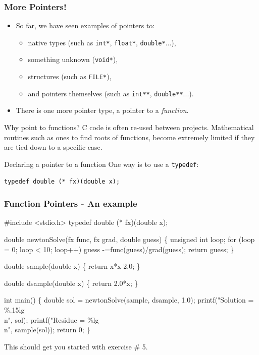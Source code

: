 \documentclass[table]{beamer}
\newif\ifschigh\schighfalse
\newcommand{\kw}[1]{\ifschigh\textcolor{red}{#1}\else\textcolor{keyword}{#1}\fi}
\newcommand{\kt}[1]{\ifschigh\textcolor{red}{#1}\else\textcolor{ctext}{#1}\fi}
\begin{document}
{
\begin{frame}[fragile]
\frametitle{More Pointers!}
\begin{itemize}
\item So far, we have seen examples of pointers to:
\begin{itemize}
\item native types (such as {\tt\kw{int}*}, {\tt\kw{float}*}, {\tt\kw{double}*}...),
\item something unknown ({\tt\kw{void}*}),
\item structures (such as {\tt FILE*}),
\item and pointers themselves (such as {\tt\kw{int}**}, {\tt\kw{double}**}...).
\end{itemize}
\item There is one more pointer type, a pointer to a \emph{function}.
\end{itemize}

\begin{block}{Why point to functions?}
C code is often re-used between projects. Mathematical routines such as ones to find roots of functions, become extremely limited if they are tied down to a specific case.
\end{block}

\begin{exampleblock}{Declaring a pointer to a function}
One way is to use a {\tt\kw{typedef}}:
\vspace{-0.1in}
\begin{center}
\tt \kw{typedef} \kw{double} (* fx)(\kw{double} x);
\end{center}
\end{exampleblock}
\end{frame}
}

\begin{frame}[fragile]
\frametitle{Function Pointers - An example}
\vspace{-0.2in}
\begin{semiverbatim}
\tiny
\kw{\#include} \kt{<stdio.h>}
\kw{typedef double} (* fx)(\kw{double} x);

\kw{double} newtonSolve(fx func, fx grad, \kw{double} guess)
\{
   \kw{unsigned int} loop;
   \kw{for} (loop = 0; loop < 10; loop++) guess -=func(guess)/grad(guess);
   \kw{return} guess;
\}

\kw{double} sample(\kw{double} x)
\{
   \kw{return} x*x-2.0;
\}

\kw{double} dsample(\kw{double} x)
\{
   \kw{return} 2.0*x;
\}

\kw{int} main()
\{
   \kw{double} sol = newtonSolve(sample, dsample, 1.0);
   printf(\kt{"Solution = \%.15lg\\n"}, sol);     
   printf(\kt{"Residue = \%lg\\n"}, sample(sol));
   \kw{return} 0;
\}
\end{semiverbatim}
This should get you started with exercise \# 5.
\end{frame}
\end{document}
